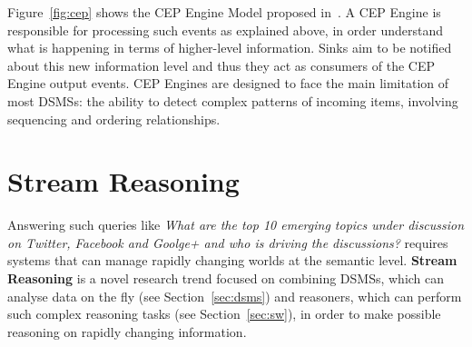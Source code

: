 Figure~\ref{fig:cep} shows the CEP Engine Model proposed in~\cite{Cugola:2012:PFI:2187671.2187677}. A CEP Engine is responsible for processing such events as explained above, in order understand what is happening in terms of higher-level information. Sinks aim to    be notified  about this new information level and thus they act as consumers of the CEP Engine output events. 
CEP Engines are designed to face the main limitation of most DSMSs: the ability to detect complex patterns of incoming items, involving sequencing and ordering relationships.

\section{Stream Reasoning}\label{sec:sfp}

Answering such queries like \textit{What are the top 10 emerging topics under discussion on Twitter, Facebook and Goolge+ and who is driving the discussions?} requires systems that can manage rapidly changing worlds at the semantic level. \textbf{Stream Reasoning} is a novel research trend focused on combining DSMSs, which can analyse data on the fly (see Section~\ref{sec:dsms}) and reasoners, which can perform such complex reasoning tasks (see Section~\ref{sec:sw}), in order to make possible reasoning on rapidly changing information.



